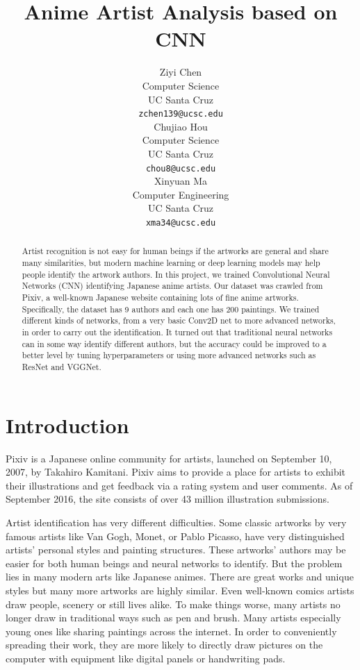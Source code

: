 \documentclass{article}
\title{Anime Artist Analysis based on CNN}
\author{Ziyi Chen \\
  Computer Science  \\
  UC Santa Cruz\\
  {\tt zchen139@ucsc.edu} \\\And
   Chujiao Hou\\
  Computer Science  \\
  UC Santa Cruz\\
  {\tt chou8@ucsc.edu} \\\And
   Xinyuan Ma\\
  Computer Engineering  \\
  UC Santa Cruz\\
  {\tt xma34@ucsc.edu} \\}
\begin{document}

\maketitle

\begin{abstract}
Artist recognition is not easy for human beings if the artworks are general and share many similarities, but modern machine learning or deep learning models may help people identify the artwork authors. In this project, we trained Convolutional Neural Networks (CNN) identifying Japanese anime artists. Our dataset was crawled from Pixiv, a well-known Japanese website containing lots of fine anime artworks. Specifically, the dataset has 9 authors and each one has 200 paintings. We trained different kinds of networks, from a very basic Conv2D net to more advanced networks, in order to carry out the identification. It turned out that traditional neural networks can in some way identify different authors, but the accuracy could be improved to a better level by tuning hyperparameters or using more advanced networks such as ResNet and VGGNet.

\end{abstract}

\section{Introduction}
Pixiv is a Japanese online community for artists, launched on September 10, 2007, by Takahiro Kamitani. Pixiv aims to provide a place for artists to exhibit their illustrations and get feedback via a rating system and user comments. As of September 2016, the site consists of over 43 million illustration submissions.

Artist identification has very different difficulties. Some classic artworks by very famous artists like Van Gogh, Monet, or Pablo Picasso, have very distinguished artists’ personal styles and painting structures. These artworks’ authors may be easier for both human beings and neural networks to identify. But the problem lies in many modern arts like Japanese animes. There are great works and unique styles but many more artworks are highly similar. Even well-known comics artists draw people, scenery or still lives alike. To make things worse, many artists no longer draw in traditional ways such as pen and brush. Many artists especially young ones like sharing paintings across the internet. In order to conveniently spreading their work, they are more likely to directly draw pictures on the computer with equipment like digital panels or handwriting pads.
\end{document}
